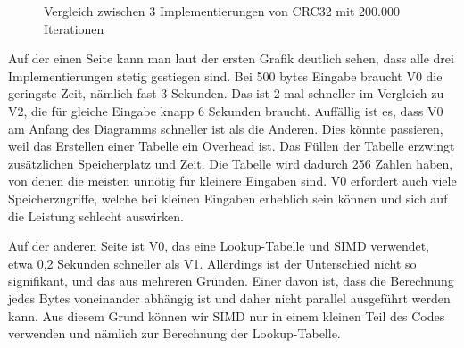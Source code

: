 \documentclass[course=erap]{aspdoc}
\begin{document}
\begin{figure}[H]
    \centering
    \captionsetup{font=small}
    \caption{Vergleich zwischen 3 Implementierungen von CRC32 mit 200.000 Iterationen}
\end{figure}
    Auf der einen Seite kann man laut der ersten Grafik  deutlich sehen, dass alle drei Implementierungen stetig gestiegen sind. Bei 500 bytes Eingabe braucht V0 die geringste Zeit, nämlich fast 3 Sekunden. Das ist 2 mal schneller im Vergleich zu V2, die für gleiche Eingabe knapp 6 Sekunden braucht. Auffällig ist es, dass V0 am Anfang des Diagramms schneller ist als die Anderen. Dies könnte passieren, weil das Erstellen einer Tabelle ein Overhead ist. Das Füllen der Tabelle erzwingt zusätzlichen Speicherplatz und Zeit. Die Tabelle wird dadurch 256 Zahlen haben, von denen die meisten unnötig für kleinere Eingaben sind. V0 erfordert auch viele Speicherzugriffe, welche bei kleinen Eingaben erheblich sein können und sich auf die Leistung schlecht auswirken.

    Auf der anderen Seite ist V0, das eine Lookup-Tabelle und SIMD verwendet, etwa 0,2 Sekunden schneller als V1. Allerdings ist der Unterschied nicht so signifikant, und das aus mehreren Gründen. Einer davon ist, dass die Berechnung jedes Bytes voneinander abhängig ist und daher nicht parallel ausgeführt werden kann. Aus diesem Grund können wir SIMD nur in einem kleinen Teil des Codes verwenden und nämlich zur Berechnung der Lookup-Tabelle.
\end{document}
